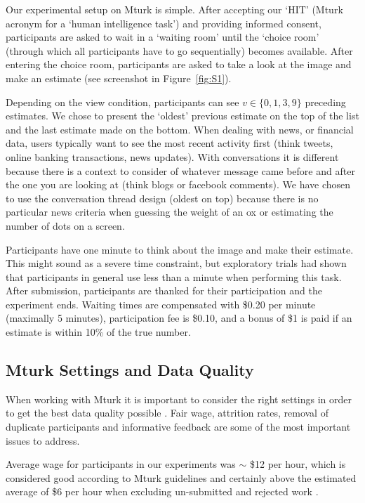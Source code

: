 \documentclass[9pt,a4paper,twocolumn,lineno]{article}
\begin{document}
Our experimental setup on Mturk is simple. After accepting our ‘HIT’ (Mturk acronym for a ‘human intelligence task’) and providing informed consent, participants are asked to wait in a ‘waiting room’ until the ‘choice room’ (through which all participants have to go sequentially) becomes available. After entering the choice room, participants are asked to take a look at the image and make an estimate (see screenshot in Figure~\ref{fig:S1}).

Depending on the view condition, participants can see $v\in\{0,1,3,9\}$ preceding estimates. We chose to present the ‘oldest’ previous estimate on the top of the list and the last estimate made on the bottom. When dealing with news, or financial data, users typically want to see the most recent activity first (think tweets, online banking transactions, news updates). With conversations it is different because there is a context to consider of whatever message came before and after the one you are looking at (think blogs or facebook comments). We have chosen to use the conversation thread design (oldest on top) because there is no particular news criteria when guessing the weight of an ox or estimating the number of dots on a screen.

Participants have one minute to think about the image and make their estimate. This might sound as a severe time constraint, but exploratory trials had shown that participants in general use less than a minute when performing this task. After submission, participants are thanked for their participation and the experiment ends. Waiting times are compensated with \$0.20 per minute (maximally 5 minutes), participation fee is \$0.10, and a bonus of \$1 is paid if an estimate is within 10\% of the true number.

\subsection*{Mturk Settings and Data Quality}
When working with Mturk it is important to consider the right settings in order to get the best data quality possible \cite{chandler2016conducting}. Fair wage, attrition rates, removal of duplicate participants and informative feedback are some of the most important issues to address.

Average wage for participants in our experiments was $\sim$ \$12 per hour, which is considered good according to Mturk guidelines and certainly above the estimated average of \$6 per hour when excluding un-submitted and rejected work \cite{hara2018data}.
\end{document}
